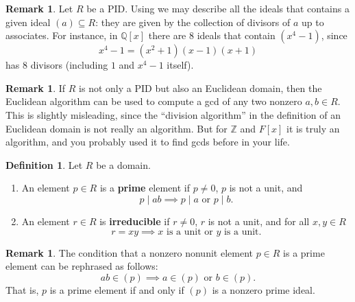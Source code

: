\documentclass[12pt]{report}
\numberwithin{equation}{section}
\numberwithin{theorem}{chapter}
\theoremstyle{definition}
\newtheorem{definition}[theorem]{Definition}
\newtheorem*{basic properties}{Basic Properties}
\newtheorem*{Important Remark}{Important Remark}
\newtheorem{remark}[theorem]{Remark}
\begin{document}
\begin{remark} 
Let $R$ be a PID.
Using 
we may describe all the ideals that contains a given ideal $(a) \subseteq R$: they are given by the collection of divisors of $a$ up to associates. For instance, in $\mathbb{Q}[x]$ there are $8$ ideals that contain $(x^4-1)$, since 
$$x^4-1 = (x^2+1)(x-1)(x+1)$$ 
has $8$ divisors (including $1$ and $x^4-1$ itself).
\end{remark}


\begin{remark} 
If $R$ is not only a PID but also an Euclidean domain, then the Euclidean algorithm can be used to compute a gcd of any two nonzero $a,b\in R$. This is slightly misleading, since the
``division algorithm'' in the definition of an Euclidean domain is not really an algorithm. But for $\mathbb{Z}$ and $F[x]$ it is truly an algorithm, and you probably used it to find gcds
before in your life. 
\end{remark}



\begin{definition} 
Let $R$ be a domain.
\begin{enumerate}
\item An element $p \in R$ is a {\bf prime} element if $p \neq 0$, $p$ is not a unit,  and 
  $$
  p \mid ab \implies p \mid a \text{ or } p \mid b.
  $$
\item An element $r \in R$ is {\bf irreducible} if $r\neq 0$, $r$ is not a unit, and for all $x,y \in R$
  $$
  r = xy \implies x \text{ is a unit or } y \text{ is a unit}.
  $$
\end{enumerate}
\end{definition}



\begin{remark}
The condition that a nonzero nonunit element $p \in R$ is a prime element can be rephrased as follows: 
$$ab \in (p) \implies a \in (p) \text{ or } b \in (p).$$
That is, $p$ is a prime element if and only if $(p)$ is a nonzero prime ideal. 
\end{remark}
\end{document}

